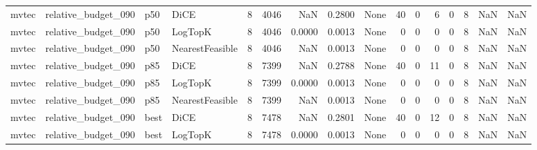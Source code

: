 \begin{tabular}{llllrrrrlrrrrrrr}
  mvtec &  relative\_budget\_090 &    p50 &            DiCE &            8 &                 4046 &                      NaN &      0.2800 &                                               None &     40 &            0 &        6 &              0 &          8 &                NaN &            NaN \\
  mvtec &  relative\_budget\_090 &    p50 &         LogTopK &            8 &                 4046 &                   0.0000 &      0.0013 &                                               None &      0 &            0 &        0 &              0 &          8 &                NaN &            NaN \\
  mvtec &  relative\_budget\_090 &    p50 & NearestFeasible &            8 &                 4046 &                      NaN &      0.0013 &                                               None &      0 &            0 &        0 &              0 &          8 &                NaN &            NaN \\
  mvtec &  relative\_budget\_090 &    p85 &            DiCE &            8 &                 7399 &                      NaN &      0.2788 &                                               None &     40 &            0 &       11 &              0 &          8 &                NaN &            NaN \\
  mvtec &  relative\_budget\_090 &    p85 &         LogTopK &            8 &                 7399 &                   0.0000 &      0.0013 &                                               None &      0 &            0 &        0 &              0 &          8 &                NaN &            NaN \\
  mvtec &  relative\_budget\_090 &    p85 & NearestFeasible &            8 &                 7399 &                      NaN &      0.0013 &                                               None &      0 &            0 &        0 &              0 &          8 &                NaN &            NaN \\
  mvtec &  relative\_budget\_090 &   best &            DiCE &            8 &                 7478 &                      NaN &      0.2801 &                                               None &     40 &            0 &       12 &              0 &          8 &                NaN &            NaN \\
  mvtec &  relative\_budget\_090 &   best &         LogTopK &            8 &                 7478 &                   0.0000 &      0.0013 &                                               None &      0 &            0 &        0 &              0 &          8 &                NaN &            NaN \\

\end{tabular}

